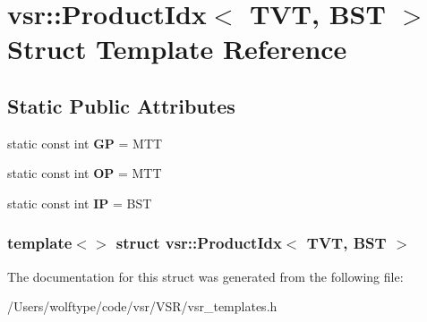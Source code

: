 \hypertarget{structvsr_1_1_product_idx_3_01_t_v_t_00_01_b_s_t_01_4}{\section{vsr\-:\-:Product\-Idx$<$ T\-V\-T, B\-S\-T $>$ Struct Template Reference}
\label{structvsr_1_1_product_idx_3_01_t_v_t_00_01_b_s_t_01_4}
}
\subsection*{Static Public Attributes}
\begin{DoxyCompactItemize}
\item 
\hypertarget{structvsr_1_1_product_idx_3_01_t_v_t_00_01_b_s_t_01_4_a7f95c81b1a6cc742a13b7f8adf51e861}{static const int {\bfseries G\-P} = M\-T\-T}\label{structvsr_1_1_product_idx_3_01_t_v_t_00_01_b_s_t_01_4_a7f95c81b1a6cc742a13b7f8adf51e861}

\item 
\hypertarget{structvsr_1_1_product_idx_3_01_t_v_t_00_01_b_s_t_01_4_a25dc17b524e47c2c9127d73e2f2d1921}{static const int {\bfseries O\-P} = M\-T\-T}\label{structvsr_1_1_product_idx_3_01_t_v_t_00_01_b_s_t_01_4_a25dc17b524e47c2c9127d73e2f2d1921}

\item 
\hypertarget{structvsr_1_1_product_idx_3_01_t_v_t_00_01_b_s_t_01_4_a34b8722f2c93c10ec04ac73d1c33c8d5}{static const int {\bfseries I\-P} = B\-S\-T}\label{structvsr_1_1_product_idx_3_01_t_v_t_00_01_b_s_t_01_4_a34b8722f2c93c10ec04ac73d1c33c8d5}

\end{DoxyCompactItemize}
\subsubsection*{template$<$$>$ struct vsr\-::\-Product\-Idx$<$ T\-V\-T, B\-S\-T $>$}



The documentation for this struct was generated from the following file\-:\begin{DoxyCompactItemize}
\item 
/\-Users/wolftype/code/vsr/\-V\-S\-R/vsr\-\_\-templates.\-h\end{DoxyCompactItemize}
